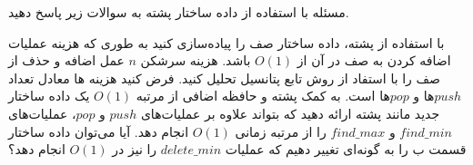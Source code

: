 ‌مسئله
با استفاده از داده ساختار پشته به سوالات زیر پاسخ دهید.

با استفاده از پشته، داده ساختار صف را پیاده‌سازی کنید به طوری که هزینه عملیات اضافه کردن به صف در آن از $O(1)$ باشد. هزینه سرشکن $n$ عمل اضافه و حذف از صف را با استفاد از روش تابع پتانسیل تحلیل کنید. فرض کنید هزینه ها معادل تعداد $push$ها و $pop$ها است.
به کمک پشته و حافظه اضافی از مرتبه $O(1)$ یک داده ساختار جدید مانند پشته ارائه دهید که بتواند علاوه بر عملیات‌های $push$ و $pop$، عملیات‌های $find\_min$ و $find\_max$ را از مرتبه زمانی $O(1)$ انجام دهد.
آیا می‌توان داده ‌ساختار قسمت ب را به گونه‌ای تغییر دهیم که عملیات $delete\_min$ را نیز در  $O(1)$  انجام دهد؟
